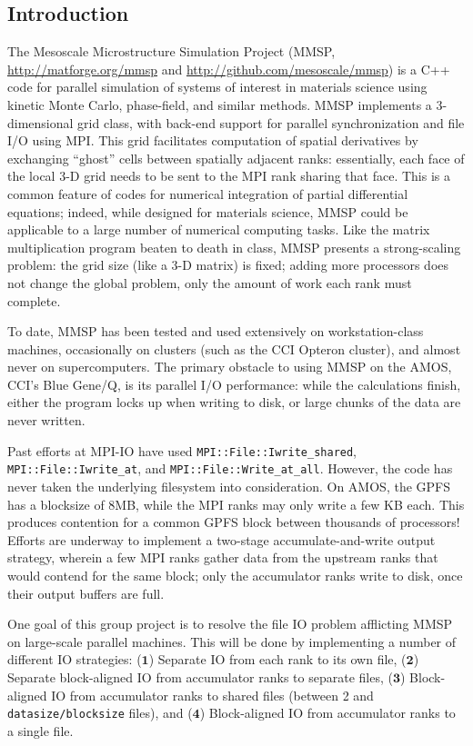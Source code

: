 \documentclass[11pt]{article}
\begin{document}
\begin{multicols}{2}
\section{Introduction}

The Mesoscale Microstructure Simulation Project (MMSP, \url{http://matforge.org/mmsp} and \url{http://github.com/mesoscale/mmsp}) is a C++ code for parallel simulation of systems of interest in materials science using kinetic Monte Carlo, phase-field, and similar methods.
MMSP implements a 3-dimensional grid class, with back-end support for parallel synchronization and file I/O using MPI.
This grid facilitates computation of spatial derivatives by exchanging ``ghost'' cells between spatially adjacent ranks:
essentially, each face of the local 3-D grid needs to be sent to the MPI rank sharing that face.
This is a common feature of codes for numerical integration of partial differential equations;
indeed, while designed for materials science, MMSP could be applicable to a large number of numerical computing tasks.
Like the matrix multiplication program beaten to death in class, MMSP presents a strong-scaling problem:
the grid size (like a 3-D matrix) is fixed; adding more processors does not change the global problem, only the amount of work each rank must complete.

To date, MMSP has been tested and used extensively on workstation-class machines, occasionally on clusters (such as the CCI Opteron cluster), and almost never on supercomputers.
The primary obstacle to using MMSP on the AMOS, CCI's Blue Gene/Q, is its parallel I/O performance:
while the calculations finish, either the program locks up when writing to disk, or large chunks of the data are never written.

Past efforts at MPI-IO have used \texttt{MPI::File::Iwrite\_shared}, \texttt{MPI::File::Iwrite\_at}, and \texttt{MPI::File::Write\_at\_all}.
However, the code has never taken the underlying filesystem into consideration.
On AMOS, the GPFS has a blocksize of 8MB, while the MPI ranks may only write a few KB each.
This produces contention for a common GPFS block between thousands of processors!
Efforts are underway to implement a two-stage accumulate-and-write output strategy, wherein a few MPI ranks gather data from the upstream ranks that would contend for the same block;
only the accumulator ranks write to disk, once their output buffers are full.

One goal of this group project is to resolve the file IO problem afflicting MMSP on large-scale parallel machines.
This will be done by implementing a number of different IO strategies: 
($\mathbf{1}$) Separate IO from each rank to its own file,
($\mathbf{2}$) Separate block-aligned IO from accumulator ranks to separate files,
($\mathbf{3}$) Block-aligned IO from accumulator ranks to shared files (between 2 and \texttt{datasize/blocksize} files), and
($\mathbf{4}$) Block-aligned IO from accumulator ranks to a single file.


\end{multicols}
\end{document}

